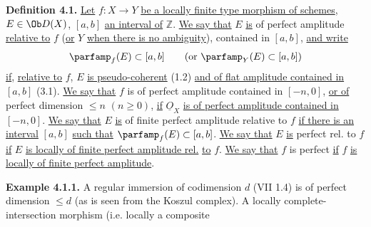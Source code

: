 \textbf{Definition 4.1.} \uline{Let} \(f:X\to Y\) \uline{be a locally finite type morphism of schemes}, \(E\in\Ob D(X)\), \([a,b]\) \uline{an interval of} \(\mathbb Z\). \uline{We say that} \(E\) \uline{is} of perfect amplitude \uline{relative to} \(f\) (\uline{or} \(Y\) \uline{when there is no ambiguity}), contained in \([a,b]\), \uline{and write}
\[
 \parfamp_f(E)\subset[a,b]\qquad(\text{or }\parfamp_Y(E)\subset[a,b])
\]
\uline{if}, \uline{relative to} \(f\), \(E\) \uline{is pseudo-coherent} (1.2) \uline{and of flat amplitude contained in} \([a,b]\) (3.1). \uline{We say that} \(f\) is of perfect amplitude contained in \([-n,0]\), \uline{or of} perfect dimension \(\leq n\) \((n\geq0)\), \uline{if} \(\underline{O}_X\) \uline{is of perfect amplitude contained in} \([-n,0]\). \uline{We say that} \(E\) \uline{is} of finite perfect amplitude relative to \(f\) \uline{if there is an interval} \([a,b]\) \uline{such that} \(\parfamp_f(E)\subset[a,b]\). \uline{We say that} \(E\) \uline{is} perfect rel. to \(f\) \uline{if} \(E\) \uline{is locally of finite perfect amplitude rel.} \uline{to} \(f\). \uline{We say that} \(f\) is perfect \uline{if} \(f\) \uline{is} \uline{locally of finite perfect amplitude}.

\textbf{Example 4.1.1.} A regular immersion of codimension \(d\) (VII 1.4) is of perfect dimension \(\leq d\) (as is seen from the Koszul complex). A locally complete-intersection morphism (i.e. locally a composite
